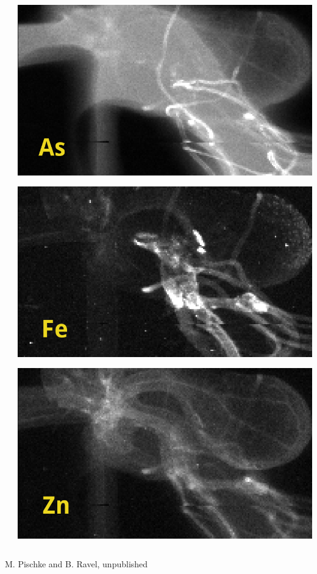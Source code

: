 \documentclass[10pt, xcolor=x11names, compress]{beamer}
\begin{document}
\begin{frame}
\begin{columns}[T]
\begin{column}{0.6\linewidth}
    \end{column}
    \begin{column}{0.4\linewidth}
      \includegraphics[width=\linewidth]{xrf/arabadopsis_as.png}

      \includegraphics[width=\linewidth]{xrf/arabadopsis_fe.png}

      \includegraphics[width=\linewidth]{xrf/arabadopsis_zn.png}
    \end{column}
  \end{columns}
  \begin{bottomnote}[0.5][20]
    M. Pischke and B. Ravel, unpublished
  \end{bottomnote}
\end{frame}
\end{document}
